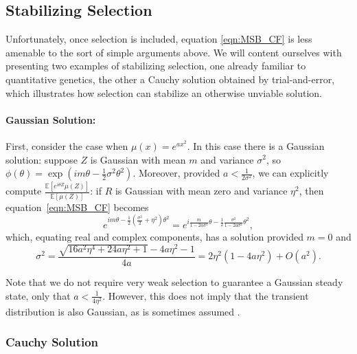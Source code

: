 \documentclass{article}
\newcommand{\1}{\mathbbm{1}}
\theoremstyle{remark}
\theoremstyle{definition}
\begin{document}
\subsection{Stabilizing Selection}
    \label{sec:stabilizing_selection}
    
Unfortunately, once selection is included, equation \eqref{eqn:MSB_CF} is less amenable to the sort of simple arguments above.  We will content ourselves with presenting two examples of stabilizing selection, one already familiar to quantitative genetics, the other a Cauchy solution obtained by trial-and-error, which illustrates how selection can stabilize an otherwise unviable solution.

\paragraph{Gaussian Solution:}
First, consider the case when $\mu(x) = e^{a x^{2}}$.   In this case there is a Gaussian solution: suppose $Z$ is Gaussian with mean $m$ and variance $\sigma^{2}$, so
$ \phi(\theta) = \exp(i m \theta - \frac{1}{2} \sigma^{2} \theta^{2}).  $
Moreover, provided $a < \frac{1}{2\sigma^{2}}$, we can explicitly compute $\frac{\mathbb{E}\left[e^{i \theta Z}\mu(Z)\right]}{\mathbb{E}[\mu(Z)]}$: %
if $R$ is Gaussian with mean zero and variance $\eta^2$, then equation~\eqref{eqn:MSB_CF} becomes
\[
	e^{i m \theta - \frac{1}{2} \left(\frac{\sigma^{2}}{2} + \eta^{2}\right)\theta^{2}}
	= e^{i \frac{m}{1-2 a \sigma^{2}}\theta 
		- \frac{1}{2} \frac{\sigma^{2}}{1-2 a \sigma^{2}}\theta^{2}},
\]
which, equating real and complex components, has a solution provided $m = 0$ and
\[
	\sigma^{2} = \frac{\sqrt{16 a^{2} \eta^{4} + 24 a \eta^{2}+1} - 4a \eta^{2} -1}{4a} 
	=  2\eta^{2}(1-4a\eta^{2}) + O(a^{2}).
\]

Note that we do not require very weak selection to guarantee a Gaussian steady state, only that $a < \frac{1}{4\eta^{2}}$.  However, this does not imply that the transient distribution is also Gaussian, as is sometimes assumed \citep[e.g.,][]{lande1976natural}. %


\subsubsection{Cauchy Solution}
    \label{sec:stabilizing_cauchy}
\end{document}
